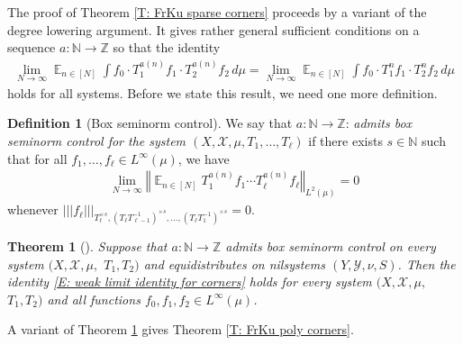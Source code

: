 \documentclass[11pt]{amsart}
\newtheorem{theorem}[lemma]{Theorem}
\theoremstyle{definition}
\newtheorem{definition}[lemma]{Definition}
\DeclareMathOperator*{\E}{\mathbb{E}}
\newcommand{\N}{{\mathbb N}}
\newcommand{\Z}{{\mathbb Z}}
\newcommand{\CX}{{\mathcal X}}
\newcommand{\CY}{{\mathcal Y}}
\newcommand{\norm}[1]{\left\Vert #1\right\Vert}
\newcommand{\nnorm}[1]{\lvert\!|\!| #1|\!|\!\rvert}
\newcommand{\inv}{^{-1}}
\newcommand{\1}{{\mathbf{1}}}
\begin{document}
The proof of Theorem \ref{T: FrKu sparse corners} proceeds by a variant of the degree lowering argument. It gives rather general sufficient conditions on a sequence $a:\N\to\Z$ so that the identity
	\begin{align}\label{E: weak limit identity for corners}
		\lim_{N\to\infty}\E_{n\in[N]}\int f_0\cdot T_1^{a(n)}f_1\cdot T_2^{a(n)}f_2 \, d\mu = \lim_{N\to\infty}\E_{n\in[N]} \int f_0\cdot T_1^n f_1\cdot T_2^n f_2\, d\mu
	\end{align}
    holds for all systems. Before we state this result, we need one more definition.
\begin{definition}[Box seminorm control]\label{D: box seminorm control}
We say that $a\colon \N\to \Z$: {\em admits box seminorm control for the system  $(X, \CX, \mu,T_1,\ldots, T_\ell)$} if there exists $s\in\N$ such that for all  $f_1,\ldots, f_\ell\in L^\infty(\mu)$, we have
\begin{align*}%
    \lim_{N\to\infty}\norm{\E_{n\in[N]} T_1^{a(n)}f_1\cdots T_\ell^{a(n)}f_\ell}_{L^2(\mu)} = 0
\end{align*}
whenever $\nnorm{f_\ell}_{T_\ell^{\times s}, (T_\ell T_{\ell-1}\inv)^{\times s}, \ldots, (T_\ell T_1\inv)^{\times s}} = 0$.
\end{definition}
\begin{theorem}[{\cite[Theorem 3.3]{FrKu25}}]\label{T: FrKu weak limit identity for corners}
	Suppose that $a\colon \N\to\Z$ admits box seminorm control on every system $(X, \CX, \mu,$\! $T_1, T_2)$ and equidistributes on nilsystems $(Y, \CY, \nu, S)$. Then the identity \eqref{E: weak limit identity for corners} holds for every system $(X, \CX, \mu,$\! $T_1, T_2)$ and all functions $f_0,f_1, f_2\in L^\infty(\mu)$.
\end{theorem}
A variant of Theorem \ref{T: FrKu weak limit identity for corners} {\cite[Theorem 3.4]{FrKu25}} gives Theorem \ref{T: FrKu poly corners}.
\end{document}
